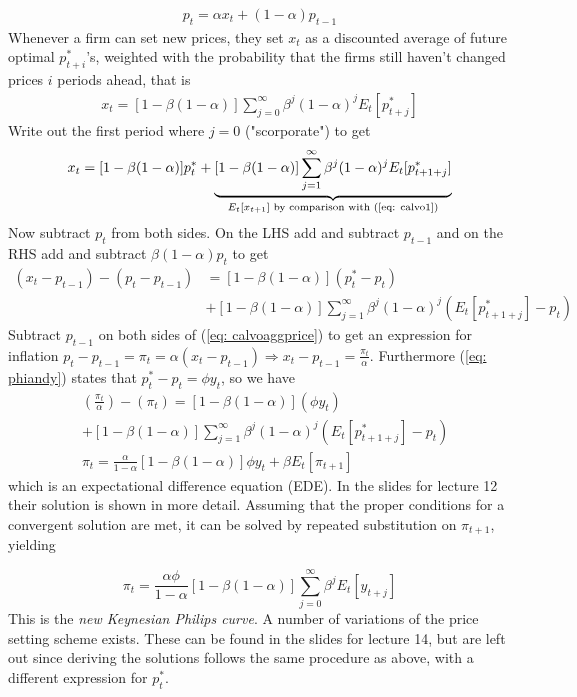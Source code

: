 \documentclass[12pt, a4paper]{article}
\begin{document}
\begin{spacing}{1.213}
\begin{align} \label{eq: calvoaggprice}
p_t = \alpha x_t + (1-\alpha) p_{t-1}
\end{align}
Whenever a firm can set new prices, they set $x_t$ as a discounted average of future optimal $p^*_{t+i}$'s, weighted with the probability that the firms still haven't changed prices $i$ periods ahead, that is
\begin{align} \label{eq: calvo1}
x_t = [1- \beta(1-\alpha)] \sum_{j=0}^{\infty} \beta^j(1-\alpha)^j E_t [p_{t+j}^*]
\end{align}
Write out the first period where $j=0$ ("scorporate") to get
\begin{align*}
x_t = [1- \beta(1-\alpha)]p_t^* + \underbrace{[1- \beta(1-\alpha)] \sum_{j=1}^{\infty} \beta^j(1-\alpha)^j E_t [p_{t+1+j}^*]}_{E_t[x_{t+1}] \textrm{ by comparison with (\ref{eq: calvo1})}}
\end{align*}
Now subtract $p_t$ from both sides. On the LHS add and subtract $p_{t-1}$ and on the RHS add and subtract $\beta(1-\alpha)p_t$ to get
\begin{align*}
(x_t-p_{t-1})-(p_{t}-p_{t-1}) &= [1- \beta(1-\alpha)](p_t^*- p_t) \\
& + [1- \beta(1-\alpha)] \sum_{j=1}^{\infty} \beta^j(1-\alpha)^j (E_t [p_{t+1+j}^*] - p_t)
\end{align*}
Subtract $p_{t-1}$ on both sides of (\ref{eq: calvoaggprice}) to get an expression for inflation $p_t - p_{t-1} = \pi_t = \alpha(x_t - p_{t-1}) \Rightarrow x_t - p_{t-1} = \frac{\pi_t}{\alpha}$. Furthermore (\ref{eq: phiandy}) states that $p_t^* - p_t = \phi y_t$, so we have
\begin{align*}
&(\frac{\pi_t}{\alpha})-(\pi_t) = [1- \beta(1-\alpha)](\phi y_t) \\
& + [1- \beta(1-\alpha)] \sum_{j=1}^{\infty} \beta^j(1-\alpha)^j (E_t [p_{t+1+j}^*] - p_t) \\
&\pi_t = \frac{\alpha}{1-\alpha}[1- \beta(1-\alpha)]\phi y_t + \beta E_t[\pi_{t+1}]
\end{align*}
which is an expectational difference equation (EDE). In the slides for lecture 12 their solution is shown in more detail. Assuming that the proper conditions for a convergent solution are met, it can be solved by repeated substitution on $\pi_{t+1}$, yielding

\begin{equation}
\pi_t = \frac{\alpha \phi}{1- \alpha}[1- \beta(1-\alpha)] \sum_{j=0}^{\infty} \beta^j E_t [y_{t+j}]
\end{equation}
This is the \textit{new Keynesian Philips curve}. A number of variations of the price setting scheme exists. These can be found in the slides for lecture 14, but are left out since deriving the solutions follows the same procedure as above, with a different expression for $p_t^*$. 



\end{spacing}
\end{document}
